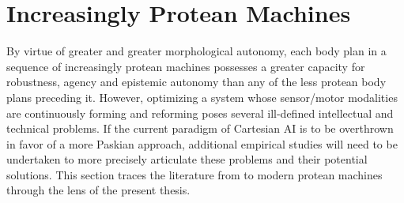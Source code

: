 


\section{Increasingly Protean Machines}










By virtue of greater and greater morphological autonomy, 
each body plan in a sequence of increasingly protean machines 
possesses a greater capacity for robustness, agency and epistemic autonomy than any of the less protean body plans preceding it.
However, optimizing a system whose sensor/motor modalities are continuously forming and reforming poses several ill-defined intellectual and technical problems.
If the current paradigm of Cartesian AI is to be overthrown in favor of a more Paskian approach,
additional empirical studies will need to be undertaken to more precisely articulate these problems and their potential solutions.
This section traces the literature from \citet{pask1958physical} to modern protean machines through the lens of the present thesis.

